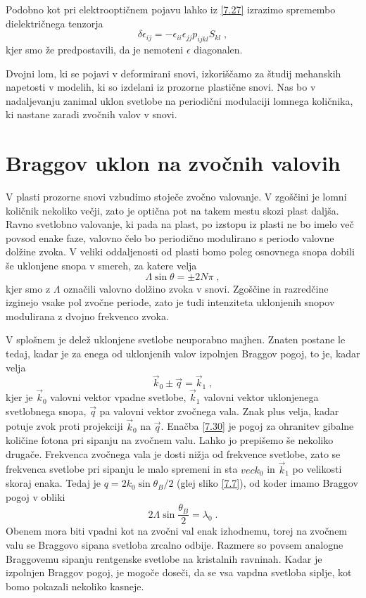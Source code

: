 Podobno kot pri elektrooptičnem pojavu lahko iz \ref{7.27} izrazimo
spremembo dielektričnega tenzorja 
\begin{equation}
\delta\epsilon_{ij}=-\epsilon_{ii}\epsilon_{jj}p_{ijkl}S_{kl}\;,\label{7.29}
\end{equation}
 kjer smo že predpostavili, da je nemoteni $\epsilon$ diagonalen.

Dvojni lom, ki se pojavi v deformirani snovi, izkoriščamo za študij
mehanskih napetosti v modelih, ki so izdelani iz prozorne plastične
snovi. Nas bo v nadaljevanju zanimal uklon svetlobe na periodični
modulaciji lomnega količnika, ki nastane zaradi zvočnih valov v snovi.


\section{Braggov uklon na zvočnih valovih}

V plasti prozorne snovi vzbudimo stoječe zvočno valovanje. V zgoščini
je lomni količnik nekoliko večji, zato je optična pot na takem mestu
skozi plast daljša. Ravno svetlobno valovanje, ki pada na plast, po
izstopu iz plasti ne bo imelo več povsod enake faze, valovno čelo
bo periodično modulirano s periodo valovne dolžine zvoka. V veliki
oddaljenosti od plasti bomo poleg osnovnega snopa dobili še uklonjene
snopa v smereh, za katere velja 
\begin{equation}
\Lambda\sin\theta=\pm2N\pi\;,\label{7.29}
\end{equation}
 kjer smo z $\Lambda$ označili valovno dolžino zvoka v snovi. Zgoščine
in razredčine izginejo vsake pol zvočne periode, zato je tudi intenziteta
uklonjenih snopov modulirana z dvojno frekvenco zvoka.

V splošnem je delež uklonjene svetlobe neuporabno majhen. Znaten postane
le tedaj, kadar je za enega od uklonjenih valov izpolnjen Braggov
pogoj, to je, kadar velja 
\begin{equation}
\vec{k}_{0}\pm\vec{q}=\vec{k}_{1}\;,\label{7.30}
\end{equation}
 kjer je $\vec{k}_{0}$ valovni vektor vpadne svetlobe, $\vec{k}_{1}$
valovni vektor uklonjenega svetlobnega snopa, $\vec{q}$ pa valovni
vektor zvočnega vala. Znak plus velja, kadar potuje zvok proti projekciji
$\vec{k}_{0}$ na $\vec{q}$. Enačba \ref{7.30} je pogoj za ohranitev
gibalne količine fotona pri sipanju na zvočnem valu. Lahko jo prepišemo
še nekoliko drugače. Frekvenca zvočnega vala je dosti nižja od frekvence
svetlobe, zato se frekvenca svetlobe pri sipanju le malo spremeni
in sta $vec{k}_{0}$ in $\vec{k}_{1}$ po velikosti skoraj enaka.
Tedaj je $q=2k_{0}\sin\theta_{B}/2$ (glej sliko \ref{7.7}), od koder
imamo Braggov pogoj v obliki 
\begin{equation}
2\Lambda\sin\frac{\theta_{B}}{2}=\lambda_{0}\;.\label{7.31}
\end{equation}
 Obenem mora biti vpadni kot na zvočni val enak izhodnemu, torej na
zvočnem valu se Braggovo sipana svetloba zrcalno odbije. Razmere so
povsem analogne Braggovemu sipanju rentgenske svetlobe na kristalnih
ravninah. Kadar je izpolnjen Braggov pogoj, je mogoče doseči, da se
vsa vapdna svetloba siplje, kot bomo pokazali nekoliko kasneje.

